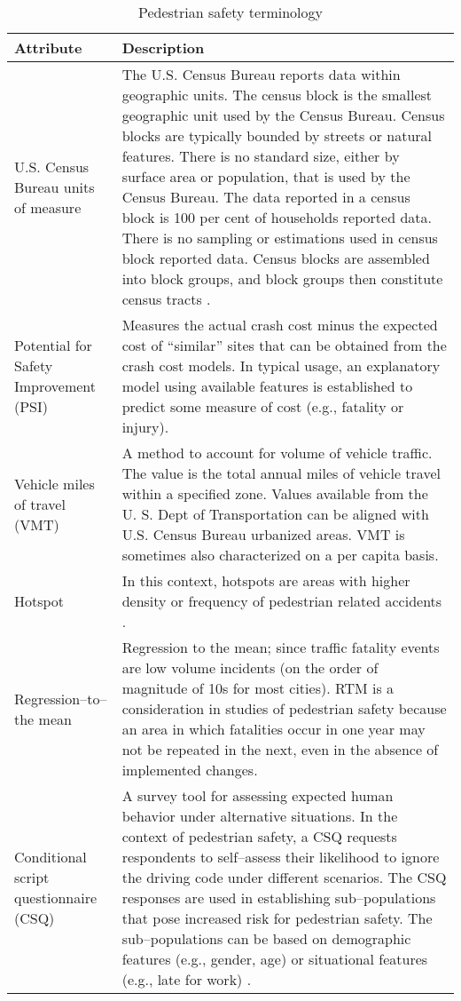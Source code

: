 \documentclass{llncs}
\begin{document}
\begin{table}[!ht]
\caption{Pedestrian safety terminology}
\label{table:terminology}
\begin{center}
\begin{tabular}{p{40mm}  p{80mm}}
\hline
\rule{0pt}{12pt}
Attribute & Description\\[2pt]
\hline
U.S. Census Bureau units of measure & The U.S. Census Bureau reports data within geographic units. The census block is the smallest geographic unit used by the Census Bureau. Census blocks are typically bounded by streets or natural features. There is no standard size, either by surface area or population, that is used by the Census Bureau.  The data reported in a  census block is 100 per cent of households reported data. There is no sampling or estimations used in census block reported data. Census blocks are assembled into block groups, and block groups then constitute census tracts \cite{usgovndgeographic}. \\	
Potential for Safety Improvement (PSI)	&	Measures the actual crash cost minus the expected cost of “similar” sites that can be obtained from the crash cost models. In typical usage, an explanatory model using available features is established to predict some measure of cost (e.g., fatality or injury). \cite{ohgov2017} \\	
Vehicle miles of travel	(VMT) &	A method to account for volume of vehicle traffic. The value is the total annual miles of vehicle travel within a specified zone. Values available from the U. S. Dept of Transportation can be aligned with U.S. Census Bureau urbanized areas. VMT is sometimes also characterized on a per capita basis.\cite{usgov2016vmt}	\\	
Hotspot & In this context, hotspots are areas with higher density or frequency of pedestrian related accidents \cite{xie2017analysis}. 	\\	
Regression--to--the mean & Regression to the mean; since traffic fatality events are low volume incidents (on the order of magnitude of 10s for most cities). RTM is a consideration in studies of pedestrian safety because an area in which fatalities occur in one year may not be repeated in the next, even in the absence of implemented changes.  	\cite{xie2017analysis}\\	
Conditional script questionnaire (CSQ) & A survey tool for assessing expected human behavior under alternative situations. In the context of pedestrian safety, a CSQ requests respondents to self--assess their likelihood to ignore the driving code under different scenarios. The CSQ responses are used in establishing sub--populations that pose increased risk for pedestrian safety. The sub--populations can be based on demographic features (e.g., gender, age) or situational features (e.g., late for work) \cite{gaymard2015conditionality}. 	\\	[2pt]
\hline
\end{tabular}
\end{center}	
\end{table}
\FloatBarrier	
\end{document}
